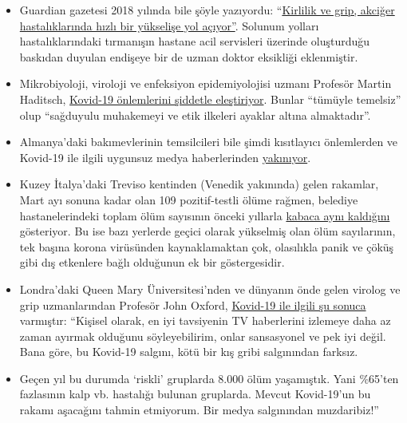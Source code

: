 \begin{itemize}
\tightlist
\item
  Guardian gazetesi 2018 yılında bile şöyle yazıyordu:
  ``\href{https://www.theguardian.com/society/2018/dec/09/steep-rise-lung-related-illness-hospitals-nhs}{Kirlilik
  ve grip, akciğer hastalıklarında hızlı bir yükselişe yol açıyor''}.
  Solunum yolları hastalıklarındaki tırmanışın hastane acil servisleri
  üzerinde oluşturduğu baskıdan duyulan endişeye bir de uzman doktor
  eksikliği eklenmiştir.
\item
  Mikrobiyoloji, viroloji ve enfeksiyon epidemiyolojisi uzmanı Profesör
  Martin Haditsch,
  \href{https://www.youtube.com/watch?v=PtzHH8DhgZM}{Kovid-19
  önlemlerini şiddetle eleştiriyor}. Bunlar ``tümüyle temelsiz'' olup
  ``sağduyulu muhakemeyi ve etik ilkeleri ayaklar altına almaktadır''.
\item
  Almanya'daki bakımevlerinin temsilcileri bile şimdi kısıtlayıcı
  önlemlerden ve Kovid-19 ile ilgili uygunsuz medya haberlerinden
  \href{https://pflege-prisma.de/2020/03/31/sterbezahlen-in-pflegeheimen/}{yakınıyor}.
\item
  Kuzey İtalya'daki Treviso kentinden (Venedik yakınında) gelen
  rakamlar, Mart ayı sonuna kadar olan 109 pozitif-testli ölüme rağmen,
  belediye hastanelerindeki toplam ölüm sayısının önceki yıllarla
  \href{https://swprs.files.wordpress.com/2020/04/reppublica-treviso.jpg}{kabaca
  aynı kaldığını} gösteriyor. Bu ise bazı yerlerde geçici olarak
  yükselmiş olan ölüm sayılarının, tek başına korona virüsünden
  kaynaklamaktan çok, olasılıkla panik ve çöküş gibi dış etkenlere bağlı
  olduğunun ek bir göstergesidir.
\item
  Londra'daki Queen Mary Üniversitesi'nden ve dünyanın önde gelen
  virolog ve grip uzmanlarından Profesör John Oxford,
  \href{https://novuscomms.com/2020/03/31/a-view-from-the-hvivo-open-orphan-orph-laboratory-professor-john-oxford/}{Kovid-19
  ile ilgili şu sonuca} varmıştır: ``Kişisel olarak, en iyi tavsiyenin
  TV haberlerini izlemeye daha az zaman ayırmak olduğunu söyleyebilirim,
  onlar sansasyonel ve pek iyi değil. Bana göre, bu Kovid-19 salgını,
  kötü bir kış gribi salgınından farksız. 
\item
  Geçen yıl bu durumda `riskli' gruplarda 8.000 ölüm yaşamıştık. Yani
  \%65'ten fazlasının kalp vb. hastalığı bulunan gruplarda. Mevcut
  Kovid-19'un bu rakamı aşacağını tahmin etmiyorum. Bir medya
  salgınından muzdaribiz!''
\end{itemize}

